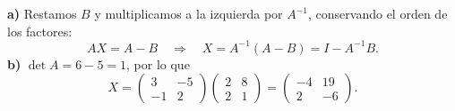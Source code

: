\textbf{a)} Restamos $B$ y multiplicamos a la izquierda por $A^{-1}$, conservando el orden de los factores:
\[
AX=A-B
\quad\Longrightarrow\quad X=A^{-1}(A-B)=I-A^{-1}B.
\]
\textbf{b)} $\det A=6-5=1$, por lo que
\[
X=\begin{pmatrix}3&-5\\-1&2\end{pmatrix}
\begin{pmatrix}2&8\\2&1\end{pmatrix}
=\boxed{\begin{pmatrix}-4&19\\2&-6\end{pmatrix}}.
\]
